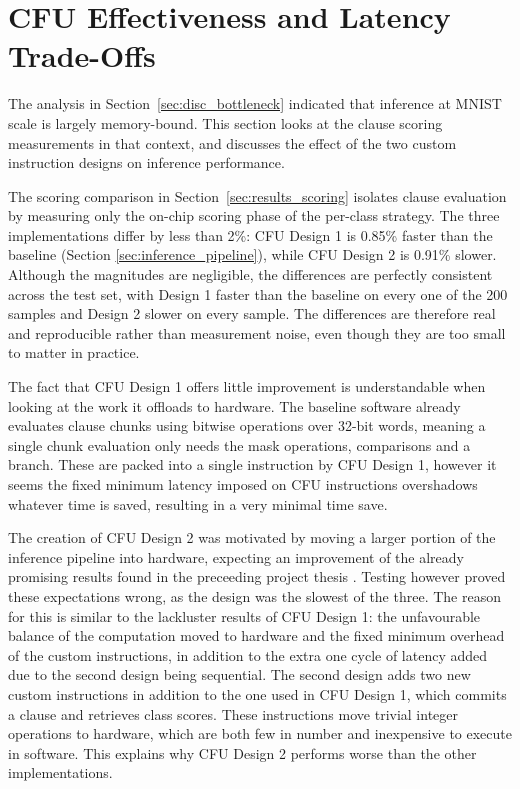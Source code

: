 \section{CFU Effectiveness and Latency Trade-Offs}
\label{sec:disc_cfu}

The analysis in Section~\ref{sec:disc_bottleneck} indicated that inference at MNIST scale is largely memory-bound. This section looks at the clause scoring measurements in that context, and discusses the effect of the two custom instruction designs on inference performance.

The scoring comparison in Section~\ref{sec:results_scoring} isolates clause evaluation by measuring only the on-chip scoring phase of the per-class strategy. The three implementations differ by less than 2\%: CFU Design 1 is 0.85\% faster than the baseline (Section \ref{sec:inference_pipeline}), while CFU Design 2 is 0.91\% slower. Although the magnitudes are negligible, the differences are perfectly consistent across the test set, with Design 1 faster than the baseline on every one of the 200 samples and Design 2 slower on every sample. The differences are therefore real and reproducible rather than measurement noise, even though they are too small to matter in practice.

The fact that CFU Design 1 offers little improvement is understandable when looking at the work it offloads to hardware.  The baseline software already evaluates clause chunks using bitwise operations over 32-bit words, meaning a single chunk evaluation only needs the mask operations, comparisons and a branch. These are packed into a single instruction by CFU Design 1, however it seems the fixed minimum latency imposed on CFU instructions overshadows whatever time is saved, resulting in a very minimal time save.

The creation of CFU Design 2 was motivated by moving a larger portion of the inference pipeline into hardware, expecting an improvement of the already promising results found in the preceeding project thesis \cite{JB2025}. Testing however proved these expectations wrong, as the design was the slowest of the three. The reason for this is similar to the lackluster results of CFU Design 1: the unfavourable balance of the computation moved to hardware and the fixed minimum overhead of the custom instructions, in addition to the extra one cycle of latency added due to the second design being sequential. The second design adds two new custom instructions in addition to the one used in CFU Design 1, which commits a clause and retrieves class scores. These instructions move trivial integer operations to hardware, which are both few in number and inexpensive to execute in software. This explains why CFU Design 2 performs worse than the other implementations.

